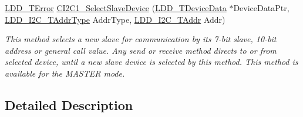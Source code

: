 \begin{DoxyCompactItemize}
\hyperlink{group___p_e___types__module_ga24c2b045fd04e79e85f261ce4df35588}{L\-D\-D\-\_\-\-T\-Error} \hyperlink{group___c_i2_c1__module_gaab2f3efe50ee5b9aeebb3bc34a010137}{C\-I2\-C1\-\_\-\-Select\-Slave\-Device} (\hyperlink{group___p_e___types__module_gac5cf1362f1f0e3a2ce71b1bf2276d091}{L\-D\-D\-\_\-\-T\-Device\-Data} $\ast$Device\-Data\-Ptr, \hyperlink{group___p_e___types__module_gaccbea298b282be066f72f84d126a5f08}{L\-D\-D\-\_\-\-I2\-C\-\_\-\-T\-Addr\-Type} Addr\-Type, \hyperlink{group___p_e___types__module_ga3f15c9fc3d89b1a0eb58b1b57efcf06a}{L\-D\-D\-\_\-\-I2\-C\-\_\-\-T\-Addr} Addr)
\begin{DoxyCompactList}\small\item\em This method selects a new slave for communication by its 7-\/bit slave, 10-\/bit address or general call value. Any send or receive method directs to or from selected device, until a new slave device is selected by this method. This method is available for the M\-A\-S\-T\-E\-R mode. \end{DoxyCompactList}\end{DoxyCompactItemize}


\subsection{Detailed Description}


